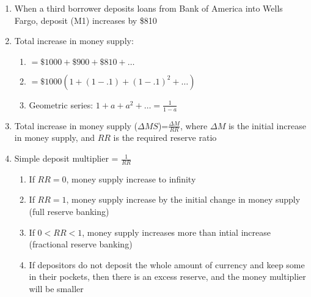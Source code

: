 \documentclass[12pt]{article}
\begin{document}
\begin{enumerate}
\begin{enumerate}
\begin{enumerate}
              \item When a third borrower deposits loans from Bank of America into Wells Fargo, deposit (M1) increases by \$810

              \item Total increase in money supply:

                \begin{enumerate}
                    
                  \item $=\$1000 + \$900 + \$810 + \dots$

                  \item $=\$1000 \left( 1 + (1-.1) + (1-.1)^2 + \dots  \right)$

                  \item Geometric series: $1+a+a^2+\dots=\frac{1}{1-a}$

                \end{enumerate}

              \item Total increase in money supply ($\Delta MS$)=$\frac{\Delta M}{RR}$, where $\Delta M$ is the initial increase in money supply, and $RR$ is the required reserve ratio

              \item Simple deposit multiplier = $\frac{1}{RR}$

                \begin{enumerate}

                  \item If $RR=0$, money supply increase to infinity

                  \item If $RR=1$, money supply increase by the initial change in money supply (full reserve banking)

                  \item If $0<RR<1$, money supply increases more than intial increase (fractional reserve banking)

                  \item If depositors do not deposit the whole amount of currency and keep some in their pockets, then there is an excess reserve, and the money multiplier will be smaller

                \end{enumerate}

            \end{enumerate}


\end{enumerate}
\end{enumerate}
\end{document}
